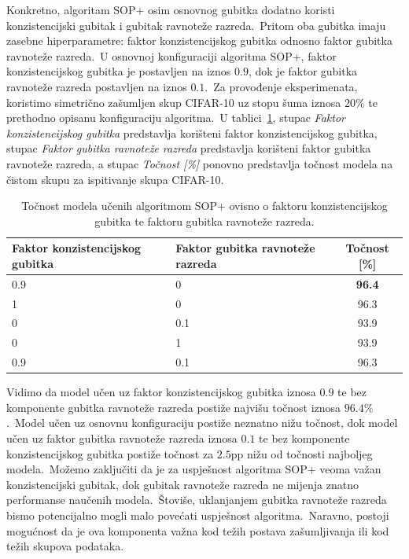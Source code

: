 \documentclass[diplomskirad]{fer}
\begin{document}
Konkretno, algoritam SOP+ osim osnovnog gubitka dodatno koristi konzistencijski gubitak i gubitak ravnoteže razreda.\ Pritom oba gubitka imaju zasebne hiperparametre: faktor konzistencijskog gubitka odnosno faktor gubitka ravnoteže razreda.\ 
U osnovnoj konfiguraciji algoritma SOP+, faktor konzistencijskog gubitka je postavljen na iznos $0.9$, dok je faktor gubitka ravnoteže razreda postavljen na iznos $0.1$.\ 
Za provođenje eksperimenata, koristimo simetrično zašumljen skup CIFAR-10 uz stopu šuma iznosa $20\%$ te prethodno opisanu konfiguraciju algoritma.\ 
U tablici~\ref{tbl:usporedba_sop_gubitak}, stupac \textit{Faktor konzistencijskog gubitka} predstavlja korišteni faktor konzistencijskog gubitka, stupac \textit{Faktor gubitka ravnoteže razreda} predstavlja korišteni faktor gubitka ravnoteže razreda, a stupac \textit{Točnost [\%]} ponovno predstavlja točnost modela na čistom skupu za ispitivanje skupa CIFAR-10.\ 

\begin{table}[htb]
  \caption{Točnost modela učenih algoritmom SOP+ ovisno o faktoru konzistencijskog gubitka te faktoru gubitka ravnoteže razreda.}
  \label{tbl:usporedba_sop_gubitak}
  \centering
  \begin{tabular}{ll||c}
  Faktor konzistencijskog gubitka & Faktor gubitka ravnoteže razreda & Točnost [\%] \\ \hline \hline
  0.9 & 0 & \textbf{96.4} \\
  1 & 0 & 96.3 \\ \hline
  0 & 0.1 & 93.9 \\
  0 & 1 & 93.9 \\ \hline
  0.9 & 0.1 & 96.3 \\
  \end{tabular}
\end{table}

Vidimo da model učen uz faktor konzistencijskog gubitka iznosa $0.9$ te bez komponente gubitka ravnoteže razreda postiže najvišu točnost iznosa $96.4\%$.\ 
Model učen uz osnovnu konfiguraciju postiže neznatno nižu točnost, dok model učen uz faktor gubitka ravnoteže razreda iznosa $0.1$ te bez komponente konzistencijskog gubitka postiže točnost za $2.5$pp nižu od točnosti najboljeg modela.\ 
Možemo zaključiti da je za uspješnost algoritma SOP+ veoma važan konzistencijski gubitak, dok gubitak ravnoteže razreda ne mijenja znatno performanse naučenih modela.\ 
Štoviše, uklanjanjem gubitka ravnoteže razreda bismo potencijalno mogli malo povećati uspješnost algoritma.\ Naravno, postoji mogućnost da je ova komponenta važna kod težih postava zašumljivanja ili kod težih skupova podataka.\ 
\end{document}
